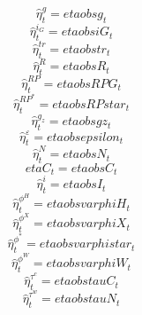 \begin{dmath}
{\hat{\eta}^{g}_{t}}={etaobsg_{t}}
\end{dmath}
\begin{dmath}
{\hat{\eta}^{i_G}_{t}}={etaobsiG_{t}}
\end{dmath}
\begin{dmath}
{\hat{\eta}^{tr}_{t}}={etaobstr_{t}}
\end{dmath}
\begin{dmath}
{\hat{\eta}^{R}_{t}}={etaobsR_{t}}
\end{dmath}
\begin{dmath}
{\hat{\eta}^{RP}_{t}}={etaobsRPG_{t}}
\end{dmath}
\begin{dmath}
{\hat{\eta}^{RP^*}_{t}}={etaobsRPstar_{t}}
\end{dmath}
\begin{dmath}
{\hat{\eta}^{g_z}_{t}}={etaobsgz_{t}}
\end{dmath}
\begin{dmath}
{\hat{\eta}^{\varepsilon}_{t}}={etaobsepsilon_{t}}
\end{dmath}
\begin{dmath}
{\hat{\eta}^{N}_{t}}={etaobsN_{t}}
\end{dmath}
\begin{dmath}
{etaC_{t}}={etaobsC_{t}}
\end{dmath}
\begin{dmath}
{\hat{\eta}^{i}_{t}}={etaobsI_{t}}
\end{dmath}
\begin{dmath}
{\hat{\eta}^{\phi^H}_{t}}={etaobsvarphiH_{t}}
\end{dmath}
\begin{dmath}
{\hat{\eta}^{\phi^X}_{t}}={etaobsvarphiX_{t}}
\end{dmath}
\begin{dmath}
{\hat{\eta}^{\phi^*}_{t}}={etaobsvarphistar_{t}}
\end{dmath}
\begin{dmath}
{\hat{\eta}^{\phi^W}_{t}}={etaobsvarphiW_{t}}
\end{dmath}
\begin{dmath}
{\hat{\eta}^{\tau^c}_{t}}={etaobstauC_{t}}
\end{dmath}
\begin{dmath}
{\hat{\eta}^{\tau^w}_{t}}={etaobstauN_{t}}
\end{dmath}
